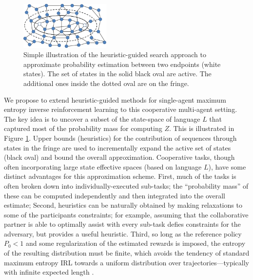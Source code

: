 \documentclass[letterpaper, 11 pt, onecolumn]{article}
\begin{document}
\begin{figure}
\includegraphics[width=0.4\textwidth]{fig//softstar.png}
\caption{Simple illustration of the heuristic-guided search approach to approximate probability estimation between two endpoints (white states).  The set of states in the solid black oval are active. The additional ones inside the dotted oval are on the fringe.}
\label{fig:softstar}
\end{figure}

We propose to extend heuristic-guided methods for single-agent maximum entropy inverse reinforcement learning \cite{monfort2015softstar} to this cooperative multi-agent setting.
The key idea is to uncover a subset of the state-space of language $L$ that captured most of the probability mass for computing $Z$.
This is illustrated in Figure \ref{fig:softstar}. Upper bounds (heuristics) for the contribution of sequences through states in the fringe are used to incrementally expand the active set of states (black oval) and bound the overall approximation.
Cooperative tasks, though often incorporating large state effective spaces (based on language $L$), have some distinct advantages for this approximation scheme.
First, much of the tasks is often broken down into individually-executed sub-tasks; the ``probability mass'' of these can be computed independently and then integrated into the overall estimate;
Second, heuristics can be naturally obtained by making relaxations to some of the participants constraints; for example, assuming that the collaborative partner is able to optimally assist with every sub-task defies constraints for the adversary, but provides a useful heuristic.
Third, so long as the reference policy $P_0 < 1$ and some regularization of the estimated rewards is imposed, the entropy of the resulting distribution must be finite, which avoids the tendency of standard maximum entropy IRL towards a uniform distribution over trajectories---typically with infinite expected length \cite{ziebart2010modeling}.
\end{document}
